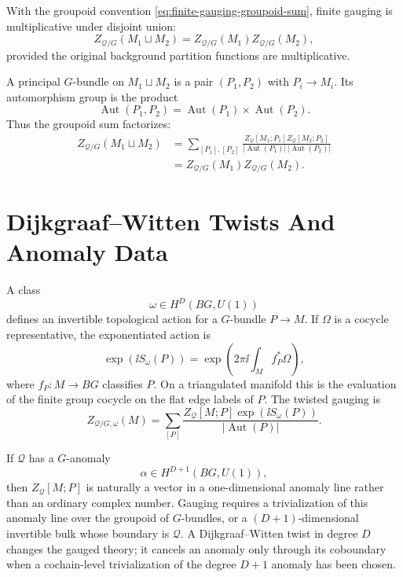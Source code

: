 \begin{remark}
\label{rem:finite-gauging-disjoint-union}
With the groupoid convention \eqref{eq:finite-gauging-groupoid-sum}, finite
gauging is multiplicative under disjoint union:
\[
  Z_{\mathcal Q/G}(M_1\sqcup M_2)
  =
  Z_{\mathcal Q/G}(M_1)Z_{\mathcal Q/G}(M_2),
\]
provided the original background partition functions are multiplicative.

A principal \(G\)-bundle on \(M_1\sqcup M_2\) is a pair
\((P_1,P_2)\) with \(P_i\to M_i\).  Its automorphism group is the product
\[
  \operatorname{Aut}(P_1,P_2)
  =
  \operatorname{Aut}(P_1)\times\operatorname{Aut}(P_2).
\]
Thus the groupoid sum factorizes:
\[
\begin{aligned}
  Z_{\mathcal Q/G}(M_1\sqcup M_2)
  &=
  \sum_{[P_1],[P_2]}
  \frac{
    Z_{\mathcal Q}[M_1;P_1]Z_{\mathcal Q}[M_2;P_2]
  }{
    |\operatorname{Aut}(P_1)|\,|\operatorname{Aut}(P_2)|
  }  \\
  &=
  Z_{\mathcal Q/G}(M_1)Z_{\mathcal Q/G}(M_2).
\end{aligned}
\]
\end{remark}

\section{Dijkgraaf--Witten Twists And Anomaly Data}

A class
\[
  \omega\in H^D(BG,U(1))
\]
defines an invertible topological action for a \(G\)-bundle \(P\to M\).  If
\(\Omega\) is a cocycle representative, the exponentiated action is
\[
  \exp(\ii S_\omega(P))
  =
  \exp\left(2\pi\ii\int_M f_P^*\Omega\right),
\]
where \(f_P:M\to BG\) classifies \(P\).  On a triangulated manifold this is
the evaluation of the finite group cocycle on the flat edge labels of \(P\).
The twisted gauging is
\begin{equation}
  Z_{\mathcal Q/G,\omega}(M)
  =
  \sum_{[P]}
  \frac{Z_{\mathcal Q}[M;P]\exp(\ii S_\omega(P))}
       {|\operatorname{Aut}(P)|}.
  \label{eq:dw-twisted-gauging}
\end{equation}

If \(\mathcal Q\) has a \(G\)-anomaly
\[
  \alpha\in H^{D+1}(BG,U(1)),
\]
then \(Z_{\mathcal Q}[M;P]\) is naturally a vector in a one-dimensional
anomaly line rather than an ordinary complex number.  Gauging requires a
trivialization of this anomaly line over the groupoid of \(G\)-bundles, or a
\((D+1)\)-dimensional invertible bulk whose boundary is \(\mathcal Q\).  A
Dijkgraaf--Witten twist in degree \(D\) changes the gauged theory; it cancels
an anomaly only through its coboundary when a cochain-level trivialization of
the degree \(D+1\) anomaly has been chosen.

